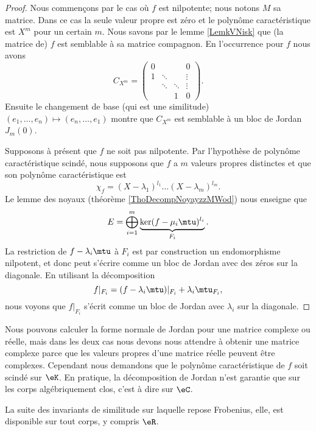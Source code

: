 \begin{proof}
    Nous commençons par le cas où \( f\) est nilpotente; nous notons \( M\) sa matrice. Dans ce cas la seule valeur propre est zéro et le polynôme caractéristique est \( X^m\) pour un certain \( m\). Nous savons par le lemme \ref{LemkVNisk} que (la matrice de) \( f\) est semblable à sa matrice compagnon. En l'occurrence pour \( f\) nous avons
    \begin{equation}
        C_{X^m}=\begin{pmatrix}
             0   &       &       &  0     \\
             1   &   \ddots    &       &   \vdots    \\
                &   \ddots    &   \ddots    &    \vdots   \\ 
                &       &   1    &   0     
         \end{pmatrix}.
    \end{equation}
    Ensuite le changement de base (qui est une similitude) \( (e_1,\ldots, e_n)\mapsto(e_n,\ldots, e_1)\) montre que \( C_{X^m}\) est semblable à un bloc de Jordan \( J_m(0)\).

    Supposons à présent que \( f\) ne soit pas nilpotente. Par l'hypothèse de polynôme caractéristique scindé, nous supposons que \( f\) a \( m\) valeurs propres distinctes et que son polynôme caractéristique est
    \begin{equation}
        \chi_f=(X-\lambda_1)^{l_1}\ldots (X-\lambda_m)^{l_m}.
    \end{equation}
    Le lemme des noyaux (théorème \ref{ThoDecompNoyayzzMWod}) nous enseigne que
    \begin{equation}
        E=\bigoplus_{i=1}^m\underbrace{\ker(f-\mu_i\mtu)^{l_i}}_{F_i}.
    \end{equation}
    La restriction de \( f-\lambda_i\mtu\) à \( F_i\) est par construction un endomorphisme nilpotent, et donc peut s'écrire comme un bloc de Jordan avec des zéros sur la diagonale. En utilisant la décomposition
    \begin{equation}
        f|_{F_i}=(f-\lambda_i\mtu)|_{F_i}+\lambda_i\mtu_{F_i},
    \end{equation}
    nous voyons que \( f|_{F_i}\) s'écrit comme un bloc de Jordan avec \( \lambda_i\) sur la diagonale.
\end{proof}

\begin{remark}
    Nous pouvons calculer la forme normale de Jordan pour une matrice complexe ou réelle, mais dans les deux cas nous devons nous attendre à obtenir une matrice complexe parce que les valeurs propres d'une matrice réelle peuvent être complexes. Cependant nous demandons que le polynôme caractéristique de \( f\) soit scindé sur \( \eK\). En pratique, la décomposition de Jordan n'est garantie que sur les corps algébriquement clos, c'est à dire sur \( \eC\).

    La suite des invariants de similitude sur laquelle repose Frobenius, elle, est disponible sur tout corps, y compris \( \eR\).
\end{remark}

